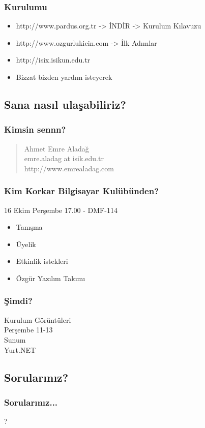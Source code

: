 \documentclass{beamer}
\begin{document}
	\begin{frame}
	 \frametitle{Kurulumu}
		\begin{itemize}
		 \item http://www.pardus.org.tr -> İNDİR -> Kurulum Kılavuzu
		 \item http://www.ozgurlukicin.com -> İlk Adımlar
		 \item http://isix.isikun.edu.tr
		 \item Bizzat bizden yardım isteyerek
		\end{itemize}

	\end{frame}


	\subsection{Sana nasıl ulaşabiliriz?}
	\begin{frame}
	 	\frametitle{Kimsin sennn?}
		\begin{quote}
 			Ahmet Emre Aladağ \\ emre.aladag at isik.edu.tr \\ http://www.emrealadag.com\\
		\end{quote}
	\end{frame}
	\begin{frame}
	 \frametitle{Kim Korkar Bilgisayar Kulübünden?}
			16 Ekim Perşembe 17.00 - DMF-114
			\begin{itemize}
				\item Tanışma
				\item Üyelik
				\item Etkinlik istekleri
				\item Özgür Yazılım Takımı
			\end{itemize}
	\end{frame}
	\begin{frame}
		\frametitle{Şimdi?}
	 	Kurulum Görüntüleri\\
		Perşembe 11-13\\
		Sunum\\
		Yurt.NET
	\end{frame}

	\subsection{Sorularınız?}
	\begin{frame}
	 	\frametitle{Sorularınız...}
		\begin{center}
		 ?
		\end{center}
		
	\end{frame}
\end{document}
